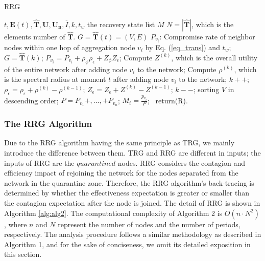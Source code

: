 \documentclass[lettersize,journal]{IEEEtran}
\begin{document}
\begin{algorithm}[h]
\small
\renewcommand{\algorithmicrequire}{\textbf{Input:}}
\renewcommand{\algorithmicensure}{\textbf{Output:}}
\caption{RRG}\label{alg:alg2} %
\begin{algorithmic}[1]
\REQUIRE $t,\bm{E}(t),\hat{\bm{T}},\bm{U},\bm{U_n},\overline{I},k,t_w$ 
\ENSURE  the recovery state list $M$
\STATE $N=|\hat{\bm{T}}|$, which is the elements number of $\hat{\bm{T}}$.
\STATE $G=\hat{\bm{T}}(t)=(V,E)$
  \STATE $P_{v_i}$: Compromise rate of neighbor nodes within one hop of aggregation node $v_i$ by Eq. (\ref{eq_trans}) and $t_w$;
  \ENDFOR
        \STATE $G=\hat{\bm{T}}(k)$;
        \STATE $P_{v_i}=P_{v_i}+\rho_{\phi}\rho_{\epsilon}+Z_{\phi}Z_{\epsilon}$;
        \STATE Compute $Z^{(k)}$, which is the overall utility of the entire network after adding node $v_i$ to the network;
        \STATE Compute $\rho^{(k)}$, which is the spectral radius at moment $t$ after adding node $v_i$ to the network;
        \IF{($Z_{\phi}(Z^{(k)}-Z^{(k-1)})-\rho_{\phi}(\rho^{(k)}-\rho^{(k-1)})]>0$}
        \STATE $k++$;
        \ELSE 
         \STATE $\rho_{\epsilon}=\rho_{\epsilon}+\rho^{(k)}-\rho^{(k-1)}$;
         \STATE $Z_{\epsilon}=Z_{\epsilon}+Z^{(k)}-Z^{(k-1)}$;
         \STATE $k--$;
         \ENDIF
    \ENDWHILE
 \ENDFOR
 \STATE sorting $V$ in descending order;
 \STATE $P=P_{v_1}+,...,+P_{v_n}$;
  \STATE $M_i=\frac{p_{v_i}}{P}$;
 \ENDFOR\
 \STATE return(R).
\end{algorithmic}
\end{algorithm}
\subsubsection{The RRG Algorithm}
Due to the RRG algorithm having the same principle as TRG, we mainly introduce the difference between them. TRG and RRG are different in inputs; the inputs of RRG are the $quarantined$ nodes. RRG considers the contagion and efficiency impact of rejoining the network for the nodes separated from the network in the quarantine zone. Therefore, the RRG algorithm's back-tracing is determined by whether the effectiveness expectation is greater or smaller than the contagion expectation after the node is joined. The detail of RRG is shown in Algorithm \ref{alg:alg2}.
The computational complexity of Algorithm 2 is $O(n\cdot N^2)$, where $n$ and $N$ represent the number of nodes and the number of periods, respectively. The analysis procedure follows a similar methodology as described in Algorithm 1, and for the sake of conciseness, we omit its detailed exposition in this section.
\end{document}
